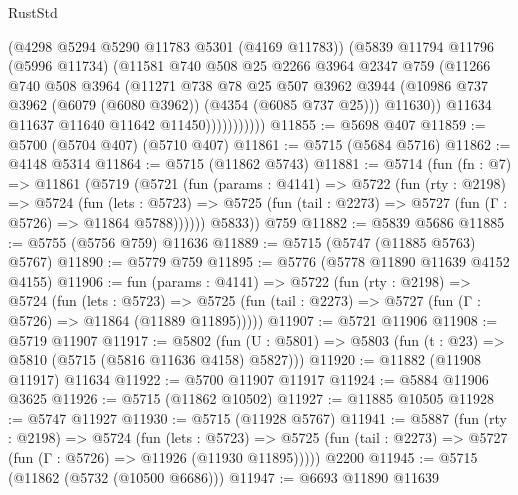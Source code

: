\begin{lexlean}{RustStd}
\begin{coremodule}
                      (@4298 @5294 @5290 @11783 @5301 (@4169 @11783))
                      (@5839
                        @11794
                        @11796
                        (@5996 @11734)
                        (@11581
                          @740
                          @508
                          @25
                          @2266
                          @3964
                          @2347
                          @759
                          (@11266
                            @740
                            @508
                            @3964
                            (@11271
                              @738
                              @78
                              @25
                              @507
                              @3962
                              @3944
                              (@10986 @737 @3962 (@6079 (@6080 @3962)) (@4354 (@6085 @737 @25)))
                              @11630))
                          @11634
                          @11637
                          @11640
                          @11642
                          @11450)))))))))))
@11855 := @5698 @407
@11859 := @5700 (@5704 @407) (@5710 @407)
@11861 := @5715 (@5684 @5716)
@11862 := @4148 @5314
@11864 := @5715 (@11862 @5743)
@11881 := @5714
    (fun (fn : @7) =>
    @11861
      (@5719
        (@5721
          (fun (params : @4141) =>
          @5722
            (fun (rty : @2198) =>
            @5724
              (fun (lets : @5723) =>
              @5725 (fun (tail : @2273) => @5727 (fun (Γ : @5726) => @11864 @5788))))))
        @5833))
    @759
@11882 := @5839 @5686
@11885 := @5755 (@5756 @759) @11636
@11889 := @5715 (@5747 (@11885 @5763) @5767)
@11890 := @5779 @759
@11895 := @5776 (@5778 @11890 @11639 @4152 @4155)
@11906 := fun (params : @4141) =>
  @5722
    (fun (rty : @2198) =>
    @5724
      (fun (lets : @5723) =>
      @5725 (fun (tail : @2273) => @5727 (fun (Γ : @5726) => @11864 (@11889 @11895)))))
@11907 := @5721 @11906
@11908 := @5719 @11907
@11917 := @5802
    (fun (U : @5801) => @5803 (fun (t : @23) => @5810 (@5715 (@5816 @11636 @4158) @5827)))
@11920 := @11882 (@11908 @11917) @11634
@11922 := @5700 @11907 @11917
@11924 := @5884 @11906 @3625
@11926 := @5715 (@11862 @10502)
@11927 := @11885 @10505
@11928 := @5747 @11927
@11930 := @5715 (@11928 @5767)
@11941 := @5887
    (fun (rty : @2198) =>
    @5724
      (fun (lets : @5723) =>
      @5725 (fun (tail : @2273) => @5727 (fun (Γ : @5726) => @11926 (@11930 @11895)))))
    @2200
@11945 := @5715 (@11862 (@5732 (@10500 @6686)))
@11947 := @6693 @11890 @11639

\end{coremodule}
\end{lexlean}
